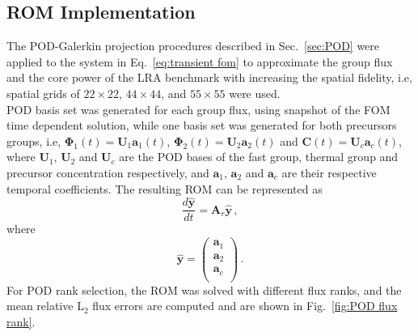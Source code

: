 \documentclass[review,number,sort&compress,12pt]{elsarticle}
\begin{document}


\subsection{ROM Implementation}

The POD-Galerkin projection procedures described in Sec.~\ref{sec:POD} were applied to the system in Eq.~\ref{eq:transient fom} to approximate the group flux and the core power of the LRA benchmark with increasing the spatial fidelity, i.e, spatial grids of $22\times 22$, $44\times44$, and $55 \times 55$ were used.\\
POD basis set was generated for each group flux, using snapshot of the FOM time dependent solution, 
while one basis set was generated for both precursors groups, i.e, 
$\mathbf{\Phi}_1(t) = \mathbf{U}_1\mathbf{a}_1(t)$, $\mathbf{\Phi}_2(t) = \mathbf{U}_2\mathbf{a}_2(t)$ and $\mathbf{C}(t) = \mathbf{U}_c\mathbf{a}_c(t)$, where $\mathbf{U}_1$, $\mathbf{U}_2$  and $\mathbf{U}_c$ are the POD bases of the fast group, thermal group and precursor concentration respectively, and $\mathbf{a}_1$, $\mathbf{a}_2$ and $\mathbf{a}_c$ are their respective temporal coefficients. 
The resulting ROM can be represented as 
\begin{equation}
\frac{d\mathbf{\hat{y}}}{dt} = \mathbf{A}_r\mathbf{\hat{y}}\, , 
\label{eq:ROM}
\end{equation}
where
\begin{equation*}
\mathbf{\hat{y}} = \begin{pmatrix}
\mathbf{a}_1\\
\mathbf{a}_2 \\
\mathbf{a}_c \\
\end{pmatrix} \,.
\end{equation*}
For POD rank selection, the ROM was solved with different flux ranks, and the mean relative L$_2$ flux errors are computed and are shown in Fig.~\ref{fig:POD flux rank}.
\end{document}
